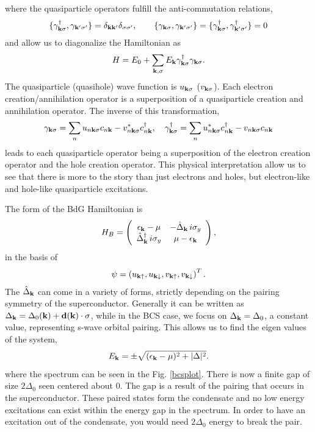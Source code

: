 where the quasiparticle operators fulfill the anti-commutation relations,
\begin{equation}
\{\gamma^\dagger_{\bf{k}\sigma},\gamma_{\bf{k'}\sigma'}\}=\delta_{\bf{kk'}}\delta_{\sigma\sigma'} ,\qquad 
\{\gamma_{\bf{k}\sigma},\gamma_{\bf{k'}\sigma'}\}=
\{\gamma^\dagger_{\bf{k}\sigma},\gamma^\dagger_{\bf{k'}\sigma'}\}=0
\end{equation}
and allow us to diagonalize the Hamiltonian as
\begin{equation}
H=E_0+\sum_{\bf{k},\sigma} E_{\bf{k}}
\gamma^{\dagger}_{\bf{k}\sigma}
\gamma_{\bf{k}\sigma}.
\end{equation}
The quasiparticle (quasihole) wave function is $u_{\bf{k}\sigma}$ ($v_{\bf{k}\sigma}$). Each electron creation/annihilation operator is a superposition of a quasiparticle creation and annihilation operator. The inverse of this transformation,
\begin{equation}
\gamma_{\bf{k}\sigma} = \sum_n u_{n \bf{k} \sigma} c_{n\bf{k}}-v^\ast_{n \bf{k} \sigma} c^\dagger_{n\bf{k}},\quad
\gamma_{\bf{k}\sigma}^\dagger = \sum_n u_{n \bf{k} \sigma}^\ast c_{n\bf{k}}^\dagger-v_{n \bf{k} \sigma} c_{n\bf{k}}
\end{equation}
 leads to each quasiparticle operator being a superposition of the electron creation operator and the hole creation operator. This physical interpretation allow us to see that there is more to the story than just electrons and holes, but electron-like and hole-like quasiparticle excitations.

The form of the BdG Hamiltonian is 
\begin{equation}
H_{B}=\left( \begin{array}{cc}
\epsilon_{\bf{k}}-\mu   &-\hat{\Delta}_{\bf{k}}\, i\sigma_y\\ 
\hat{\Delta}^{\dagger}_{\bf{k}} \, i\sigma_y &  \mu-\epsilon_{\bf{k}}
 \end{array} \right), \label{bdgHH} 
\end{equation}
in the basis of 
\begin{equation}
\psi=\left(
u_{\bf{k}\uparrow},
u_{\bf{k}\downarrow},
v_{\bf{k}\uparrow},
v_{\bf{k}\downarrow}\right)^T.
\end{equation}
The $\hat{\Delta}_{\bf{k}}$ can come in a variety of forms, strictly depending on the pairing symmetry of the superconductor. Generally it can be written as $\Delta_{\bf{k}}=\Delta_0(\bf{k})+\bf{d}(\bf{k})\cdot \bf{\sigma}$, while in the BCS case, we focus on $\Delta_{\bf{k}}=\Delta_0$, a constant value, representing s-wave orbital pairing\cite{mineev_introduction_1999}. This allows us to find the eigen values of the system,
\begin{equation}
E_{\bf{k}}=\pm\sqrt{(\epsilon_{\bf{k}}-\mu)^2 + |\Delta|^2}.
\end{equation}
where the spectrum can be seen in the Fig. \ref{bcsplot}. There is now a finite gap of size $2\Delta_0$ seen centered about 0. The gap is a result of the pairing that occurs in the superconductor. These paired states form the condensate and no low energy excitations can exist within the energy gap in the spectrum. In order to have an excitation out of the condensate, you would need $2\Delta_0$ energy to break the pair. 


